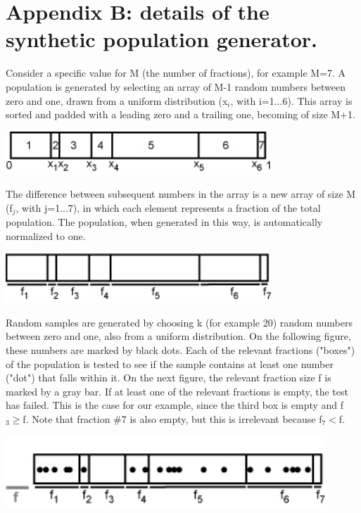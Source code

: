 \documentclass[12]{article}
\begin{document}
\section*{Appendix B: details of the synthetic population generator.}

\begin{minipage}[c]{\textwidth}

Consider a specific value for M (the number of fractions), for example
M=7.  A  population is generated by  selecting an array  of M-1 random
numbers  between  zero and  one,  drawn  from  a uniform  distribution
(x$_i$, with i=1...6). This array  is sorted and padded with a leading
zero and a trailing one, becoming of size M+1.

  \begin{center}
  \includegraphics[width=10cm]{B1.jpg}\\  
  \end{center}

The difference between subsequent numbers  in the array is a new array
of size  M (f$_j$, with j=1...7),  in which each  element represents a
fraction of  the total population.  The population,  when generated in
this way, is automatically normalized to one.

  \begin{center}
  \includegraphics[width=10cm]{B2.jpg}\\  
  \end{center}

Random samples  are generated  by choosing k  (for example  20) random
numbers between zero and one, also from a uniform distribution. On the
following figure, these numbers are marked by black dots.  Each of the
relevant fractions ("boxes") of the population is tested to see if the
sample contains at least one  number ("dot") that falls within it.  On
the next figure, the relevant fraction size f is marked by a gray bar.
If  at least  one of  the relevant  fractions is  empty, the  test has
failed. This is the case for our example, since the third box is empty
and  f$_3\geq$f. Note that  fraction \#7  is also  empty, but  this is
irrelevant because f$_7<$f.

  \begin{center}
  \includegraphics[width=12cm]{B3.jpg}\\  
  \end{center}

\end{minipage}
\end{document}
